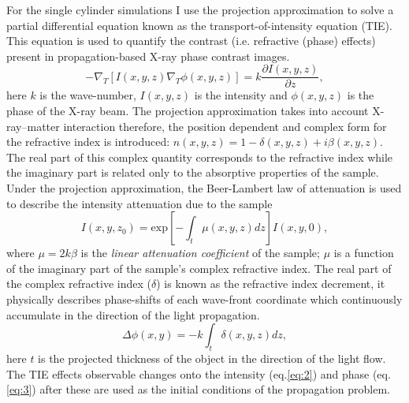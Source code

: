 \documentclass[9pt, a4paper]{article}
\begin{document}
For the single cylinder simulations I use the projection approximation to solve a partial differential equation known as the transport-of-intensity equation (TIE). This equation is used to quantify the contrast (i.e. refractive (phase) effects) present in propagation-based X-ray phase contrast images\cite{PagsTutes}.
\begin{equation}\label{eq:1}
-\nabla_{T} [I(x, y, z) \nabla_{T} \phi(x, y, z)] = k \frac{\partial I (x, y, z)}{\partial z},
\end{equation}
here $k$ is the wave-number, $I(x, y, z)$ is the intensity and $\phi(x, y, z)$ is the phase of the X-ray beam.
The projection approximation takes into account X-ray--matter interaction therefore, the position dependent and complex form for the refractive index is introduced: $n(x, y, z) = 1 - \delta(x, y, z) + i \beta(x, y, z)$. The real part of this complex quantity corresponds to the refractive index while the imaginary part is related only to the absorptive properties of the sample\cite{PagsTutes}.
Under the projection approximation, the Beer-Lambert law of attenuation is used to describe the intensity attenuation due to the sample
\begin{equation}\label{eq:2}
I(x, y, z_0) = \mathrm{exp}[-\int_{t} \mu(x, y, z) dz] I(x, y, 0),
\end{equation}
where $\mu = 2k\beta$ is the \textit{linear attenuation coefficient} of the sample; $\mu$ is a function of the imaginary part of the sample's complex refractive index.
The real part of the complex refractive index ($\delta$) is known as the refractive index decrement, it physically describes phase-shifts of each wave-front coordinate which continuously accumulate in the direction of the light propagation.
\begin{equation}\label{eq:3}
\Delta \phi(x, y) = -k \int_{t}\delta(x, y, z)dz,
\end{equation}
here $t$ is the projected thickness of the object in the direction of the light flow.
The TIE effects observable changes onto the intensity (eq.\ref{eq:2}) and phase (eq.\ref{eq:3}) after these are used as the initial conditions of the propagation problem.
\end{document}
